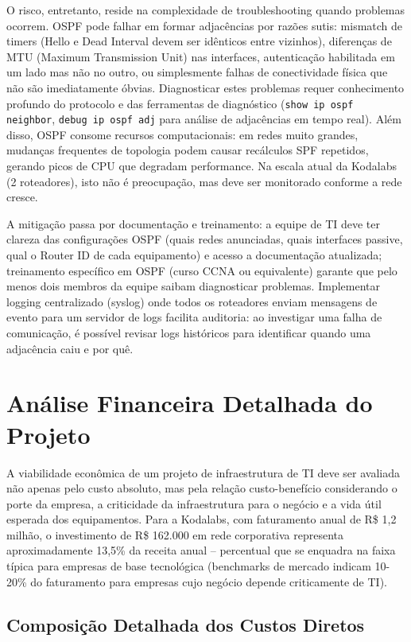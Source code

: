 \documentclass[12pt,a4paper]{article}
\begin{document}
O risco, entretanto, reside na complexidade de troubleshooting quando problemas ocorrem. OSPF pode falhar em formar adjacências por razões sutis: mismatch de timers (Hello e Dead Interval devem ser idênticos entre vizinhos), diferenças de MTU (Maximum Transmission Unit) nas interfaces, autenticação habilitada em um lado mas não no outro, ou simplesmente falhas de conectividade física que não são imediatamente óbvias. Diagnosticar estes problemas requer conhecimento profundo do protocolo e das ferramentas de diagnóstico (\texttt{show ip ospf neighbor}, \texttt{debug ip ospf adj} para análise de adjacências em tempo real). Além disso, OSPF consome recursos computacionais: em redes muito grandes, mudanças frequentes de topologia podem causar recálculos SPF repetidos, gerando picos de CPU que degradam performance. Na escala atual da Kodalabs (2 roteadores), isto não é preocupação, mas deve ser monitorado conforme a rede cresce.

A mitigação passa por documentação e treinamento: a equipe de TI deve ter clareza das configurações OSPF (quais redes anunciadas, quais interfaces passive, qual o Router ID de cada equipamento) e acesso a documentação atualizada; treinamento específico em OSPF (curso CCNA ou equivalente) garante que pelo menos dois membros da equipe saibam diagnosticar problemas. Implementar logging centralizado (syslog) onde todos os roteadores enviam mensagens de evento para um servidor de logs facilita auditoria: ao investigar uma falha de comunicação, é possível revisar logs históricos para identificar quando uma adjacência caiu e por quê.

\section{Análise Financeira Detalhada do Projeto}

A viabilidade econômica de um projeto de infraestrutura de TI deve ser avaliada não apenas pelo custo absoluto, mas pela relação custo-benefício considerando o porte da empresa, a criticidade da infraestrutura para o negócio e a vida útil esperada dos equipamentos. Para a Kodalabs, com faturamento anual de R\$ 1,2 milhão, o investimento de R\$ 162.000 em rede corporativa representa aproximadamente 13,5\% da receita anual -- percentual que se enquadra na faixa típica para empresas de base tecnológica (benchmarks de mercado indicam 10-20\% do faturamento para empresas cujo negócio depende criticamente de TI).

\subsection{Composição Detalhada dos Custos Diretos}
\end{document}
